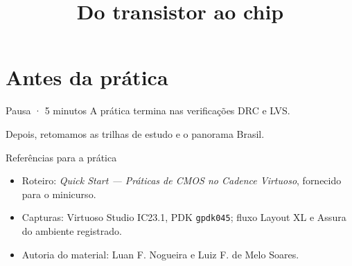


\renewcommand{\figura}[1]{\begin{center}\begin{adjustbox}{max width=\linewidth,max totalheight=4.35cm}#1\end{adjustbox}\end{center}}
\title[Aula 3 • Layout e caminhos]{\huge\textbf{Do transistor ao chip}}


\section{Antes da prática}
\begin{frame}{Pausa · 5 minutos}
\small\centering A prática termina nas verificações DRC e LVS.\par\medskip
Depois, retomamos as trilhas de estudo e o panorama Brasil.
\end{frame}
\begin{frame}{Referências para a prática}
\small\begin{itemize}
\item Roteiro: \textit{Quick Start — Práticas de CMOS no Cadence Virtuoso}, fornecido para o minicurso.
\item Capturas: Virtuoso Studio IC23.1, PDK \texttt{gpdk045}; fluxo Layout XL e Assura do ambiente registrado.
\item Autoria do material: Luan F. Nogueira e Luiz F. de Melo Soares.
\end{itemize}
\end{frame}


